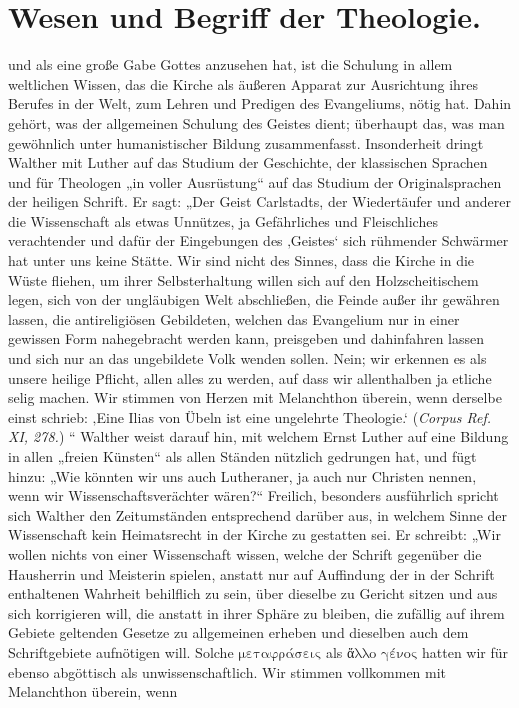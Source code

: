 \section*{Wesen und Begriff der Theologie.} und als eine große Gabe Gottes anzusehen hat, ist die Schulung in allem weltlichen Wissen, das die Kirche als äußeren Apparat zur Ausrichtung ihres Berufes in der Welt, zum Lehren und Predigen des Evangeliums, nötig hat. Dahin gehört, was der allgemeinen Schulung des Geistes dient; überhaupt das, was man gewöhnlich unter humanistischer Bildung zusammenfasst. Insonderheit dringt Walther mit Luther auf das Studium der Geschichte, der klassischen Sprachen und für Theologen „in voller Ausrüstung“ auf das Studium der Originalsprachen der heiligen Schrift. Er sagt: „Der Geist Carlstadts, der Wiedertäufer und anderer die Wissenschaft als etwas Unnützes, ja Gefährliches und Fleischliches verachtender und dafür der Eingebungen des ‚Geistes‘ sich rühmender Schwärmer hat unter uns keine Stätte. Wir sind nicht des Sinnes, dass die Kirche in die Wüste fliehen, um ihrer Selbsterhaltung willen sich auf den Holzscheitischem legen, sich von der ungläubigen Welt abschließen, die Feinde außer ihr gewähren lassen, die antireligiösen Gebildeten, welchen das Evangelium nur in einer gewissen Form nahegebracht werden kann, preisgeben und dahinfahren lassen und sich nur an das ungebildete Volk wenden sollen. Nein; wir erkennen es als unsere heilige Pflicht, allen alles zu werden, auf dass wir allenthalben ja etliche selig machen. Wir stimmen von Herzen mit Melanchthon überein, wenn derselbe einst schrieb: ‚Eine Ilias von Übeln ist eine ungelehrte Theologie.‘ (\textit{Corpus Ref. XI, 278.}) “ Walther weist darauf hin, mit welchem Ernst Luther auf eine Bildung in allen „freien Künsten“ als allen Ständen nützlich gedrungen hat, und fügt hinzu: „Wie könnten wir uns auch Lutheraner, ja auch nur Christen nennen, wenn wir Wissenschaftsverächter wären?“ Freilich, besonders ausführlich spricht sich Walther den Zeitumständen entsprechend darüber aus, in welchem Sinne der Wissenschaft kein Heimatsrecht in der Kirche zu gestatten sei. Er schreibt: „Wir wollen nichts von einer Wissenschaft wissen, welche der Schrift gegenüber die Hausherrin und Meisterin spielen, anstatt nur auf Auffindung der in der Schrift enthaltenen Wahrheit behilflich zu sein, über dieselbe zu Gericht sitzen und aus sich korrigieren will, die anstatt in ihrer Sphäre zu bleiben, die zufällig auf ihrem Gebiete geltenden Gesetze zu allgemeinen erheben und dieselben auch dem Schriftgebiete aufnötigen will. Solche $\text{μεταφράσεις}$ als $\text{ἄλλο γένος}$ hatten wir für ebenso abgöttisch als unwissenschaftlich. Wir stimmen vollkommen mit Melanchthon überein, wenn